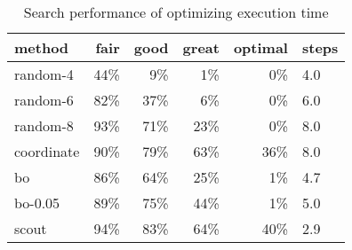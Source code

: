 \begin{table}[]
\centering
\scriptsize
\begin{tabular}{|l|r|r|r|r|l|}
\hline
method & fair               & good & great & optimal & steps \\ \hline
random-4   & 44\% & 9\%   & 1\%     & 0\%         & 4.0 \\ \hline
random-6   & 82\% & 37\%  & 6\%     & 0\%         & 6.0 \\ \hline
random-8   & 93\% & 71\%  & 23\%    & 0\%         & 8.0 \\ \hline
coordinate & 90\% & 79\%  & 63\%    & 36\%        & 8.0 \\ \hline
bo         & 86\% & 64\%  & 25\%    & 1\%         & 4.7 \\ \hline
bo-0.05    & 89\% & 75\%  & 44\%    & 1\%         & 5.0 \\ \hline
scout      & 94\% & 83\%  & 64\%    & 40\%        & 2.9 \\ \hline
\end{tabular}

\caption{Search performance of optimizing execution time}
\label{tab:search_single_time}
\end{table}